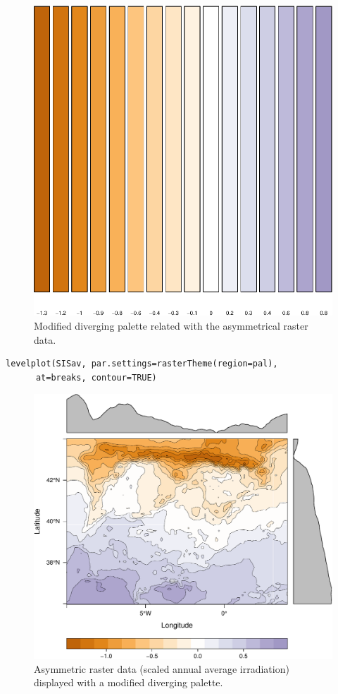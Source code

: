 \begin{figure}[htb]
\centering
\includegraphics[height=0.3\textheight]{figs/showBreak2Pal.pdf}
\caption{\label{fig:showBreak2Pal}Modified diverging palette related with the asymmetrical raster data.}
\end{figure}


\lstset{language=R,numbers=none}
\begin{lstlisting}
levelplot(SISav, par.settings=rasterTheme(region=pal),
	  at=breaks, contour=TRUE)
\end{lstlisting}

\begin{figure}[htb]
\centering
\includegraphics[width=.9\linewidth]{figs/divPalSISav.pdf}
\caption{\label{fig:divPalSISav}Asymmetric raster data (scaled annual average irradiation) displayed with a modified diverging palette.}
\end{figure}


